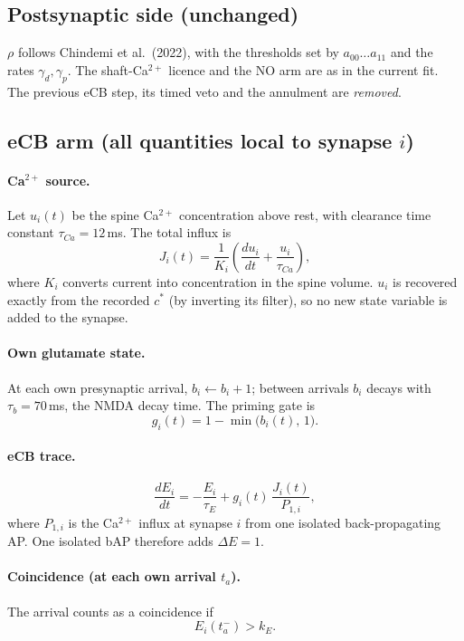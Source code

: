 \documentclass[11pt]{article}
\newcommand{\cstar}{c^{*}}
\begin{document}
\subsection{Postsynaptic side (unchanged)}
$\rho$ follows Chindemi et al.\ (2022), with the thresholds set by $a_{00}\dots a_{11}$ and the rates
$\gamma_d,\gamma_p$. The shaft-Ca$^{2+}$ licence and the NO arm are as in the current fit. The previous eCB step, its
timed veto and the annulment are \emph{removed}.

\subsection{eCB arm (all quantities local to synapse $i$)}
\paragraph{Ca$^{2+}$ source.} Let $u_i(t)$ be the spine Ca$^{2+}$ concentration above rest, with clearance time
constant $\tau_{Ca}=12$\,ms. The total influx is
\begin{equation}
J_i(t)=\frac{1}{K_i}\left(\frac{du_i}{dt}+\frac{u_i}{\tau_{Ca}}\right),
\end{equation}
where $K_i$ converts current into concentration in the spine volume. $u_i$ is recovered exactly from the recorded
$\cstar$ (by inverting its filter), so no new state variable is added to the synapse.

\paragraph{Own glutamate state.} At each own presynaptic arrival, $b_i\leftarrow b_i+1$; between arrivals $b_i$
decays with $\tau_b=70$\,ms, the NMDA decay time. The priming gate is
\begin{equation}
g_i(t)=1-\min\bigl(b_i(t),\,1\bigr).
\end{equation}

\paragraph{eCB trace.}
\begin{equation}
\frac{dE_i}{dt}=-\frac{E_i}{\tau_E}+g_i(t)\,\frac{J_i(t)}{P_{1,i}},
\end{equation}
where $P_{1,i}$ is the Ca$^{2+}$ influx at synapse $i$ from one isolated back-propagating AP. One isolated bAP
therefore adds $\Delta E=1$.

\paragraph{Coincidence (at each own arrival $t_a$).} The arrival counts as a coincidence if
\begin{equation}
E_i(t_a^-)>k_E .
\end{equation}
\end{document}
